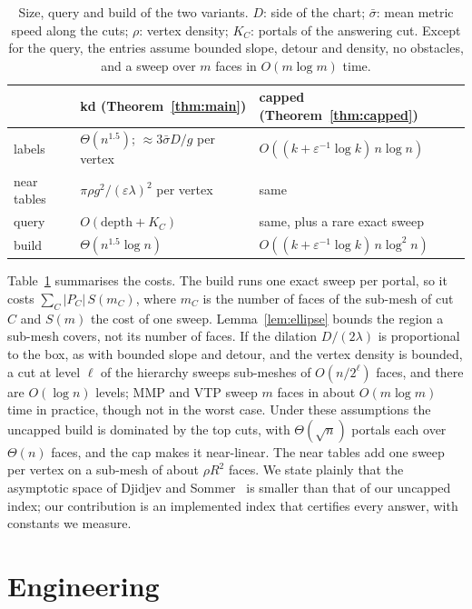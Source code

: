\documentclass[sigconf,nonacm,screen]{acmart}
\newcommand{\eps}{\varepsilon}
\begin{document}
\begin{table}[t]
\caption{Size, query and build of the two variants. $D$: side of the chart; $\bar\sigma$: mean metric speed
along the cuts; $\rho$: vertex density; $K_C$: portals of the answering cut. Except for the query, the entries
assume bounded slope, detour and density, no obstacles, and a sweep over $m$ faces in $O(m\log m)$ time.}
\label{tab:complexity}
\small
\begin{tabular}{@{}lll@{}}
\toprule
& kd (Theorem~\ref{thm:main}) & capped (Theorem~\ref{thm:capped})\\
\midrule
labels & $\Theta(n^{1.5})$; $\approx 3\bar\sigma D/g$ per vertex & $O((k+\eps^{-1}\log k)\,n\log n)$\\
near tables & $\pi\rho g^2/(\eps\lambda)^2$ per vertex & same\\
query & $O(\text{depth}+K_C)$ & same, plus a rare exact sweep\\
build & $\Theta(n^{1.5}\log n)$ & $O((k+\eps^{-1}\log k)\,n\log^2 n)$\\
\bottomrule
\end{tabular}
\end{table}

Table~\ref{tab:complexity} summarises the costs. The build runs one exact sweep per portal, so it costs
$\sum_C|P_C|\,S(m_C)$, where $m_C$ is the number of faces of the sub-mesh of cut $C$ and $S(m)$ the cost of one
sweep. Lemma~\ref{lem:ellipse} bounds the region a sub-mesh covers, not its number of faces. If the dilation
$D/(2\lambda)$ is proportional to the box, as with bounded slope and detour, and the vertex density is bounded,
a cut at level $\ell$ of the hierarchy sweeps sub-meshes of $O(n/2^\ell)$ faces, and there are $O(\log n)$
levels; MMP and VTP sweep $m$ faces in about $O(m\log m)$ time in practice, though not in the worst case. Under
these assumptions the uncapped build is dominated by the top cuts, with $\Theta(\sqrt n)$ portals each over
$\Theta(n)$ faces, and the cap makes it near-linear. The near tables add one sweep per vertex on a sub-mesh of
about $\rho R^2$ faces. We state plainly that the asymptotic space of Djidjev and Sommer~\cite{djidjev2011approximate} is
smaller than that of our uncapped index; our contribution is an implemented index that certifies every
answer, with constants we measure.

\section{Engineering}
\label{sec:engineering}
\end{document}
